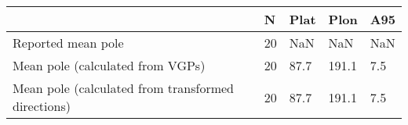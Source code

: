 \begin{tabular}{lllll}
\toprule
{} &   N &  Plat &   Plon &  A95 \\
\midrule
Reported mean pole                                 &  20 &   NaN &    NaN &  NaN \\
Mean pole (calculated from VGPs)                   &  20 &  87.7 &  191.1 &  7.5 \\
Mean pole (calculated from transformed directions) &  20 &  87.7 &  191.1 &  7.5 \\
\bottomrule
\end{tabular}
